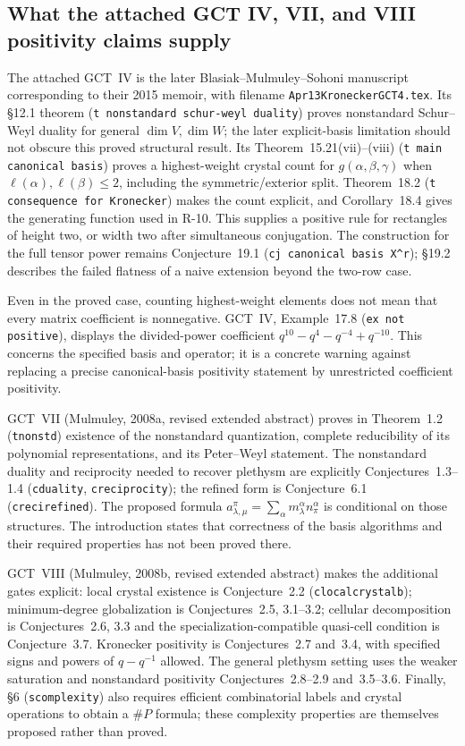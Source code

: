 \documentclass[11pt,a4paper]{article}
\theoremstyle{definition}\newtheorem{definition}{Definition}
\begin{document}
\subsection{What the attached GCT IV, VII, and VIII positivity claims supply}

The attached GCT~IV is the later Blasiak--Mulmuley--Sohoni manuscript
corresponding to their 2015 memoir, with filename
\nolinkurl{Apr13KroneckerGCT4.tex}. Its \S12.1 theorem
(\nolinkurl{t nonstandard schur-weyl duality}) proves nonstandard
Schur--Weyl duality for general $\dim V,\dim W$; the later
explicit-basis limitation should not obscure this proved
structural result. Its Theorem~15.21(vii)--(viii)
(\nolinkurl{t main canonical basis}) proves a highest-weight crystal
count for $g(\alpha,\beta,\gamma)$ when
$\ell(\alpha),\ell(\beta)\leq2$, including the symmetric/exterior
split. Theorem~18.2 (\nolinkurl{t consequence for Kronecker}) makes
the count explicit, and Corollary~18.4 gives the generating
function used in R-10. This supplies a positive rule for rectangles
of height two, or width two after simultaneous conjugation.
The construction for the full tensor power remains Conjecture~19.1
(\texttt{cj canonical basis X\^{}r}); \S19.2 describes the failed
flatness of a naive extension beyond the two-row case.

Even in the proved case, counting highest-weight elements does not
mean that every matrix coefficient is nonnegative. GCT~IV,
Example~17.8 (\nolinkurl{ex not positive}), displays the divided-power
coefficient $q^{10}-q^4-q^{-4}+q^{-10}$. This concerns the specified
basis and operator; it is a concrete warning against replacing a
precise canonical-basis positivity statement by unrestricted
coefficient positivity.

GCT~VII (Mulmuley, 2008a, revised extended abstract) proves in
Theorem~1.2 (\nolinkurl{tnonstd}) existence of the nonstandard
quantization, complete reducibility of its polynomial
representations, and its Peter--Weyl statement. The nonstandard
duality and reciprocity needed to recover plethysm are explicitly
Conjectures~1.3--1.4 (\nolinkurl{cduality}, \nolinkurl{creciprocity});
the refined form is Conjecture~6.1 (\nolinkurl{crecirefined}).
The proposed formula
$a_{\lambda,\mu}^{\pi}=\sum_\alpha
m_\lambda^\alpha n_\pi^\alpha$ is conditional on those structures.
The introduction states that correctness of the basis algorithms
and their required properties has not been proved there.

GCT~VIII (Mulmuley, 2008b, revised extended abstract) makes the
additional gates explicit: local crystal existence is Conjecture~2.2
(\nolinkurl{clocalcrystalb}); minimum-degree globalization is
Conjectures~2.5, 3.1--3.2; cellular decomposition is Conjectures~2.6,
3.3 and the specialization-compatible quasi-cell condition is
Conjecture~3.7. Kronecker positivity is Conjectures~2.7 and~3.4,
with specified signs and powers of $q-q^{-1}$ allowed. The general
plethysm setting uses the weaker saturation and nonstandard
positivity Conjectures~2.8--2.9 and~3.5--3.6. Finally, \S6
(\nolinkurl{scomplexity}) also requires efficient combinatorial
labels and crystal operations to obtain a $\#P$ formula; these
complexity properties are themselves proposed rather than proved.
\end{document}
